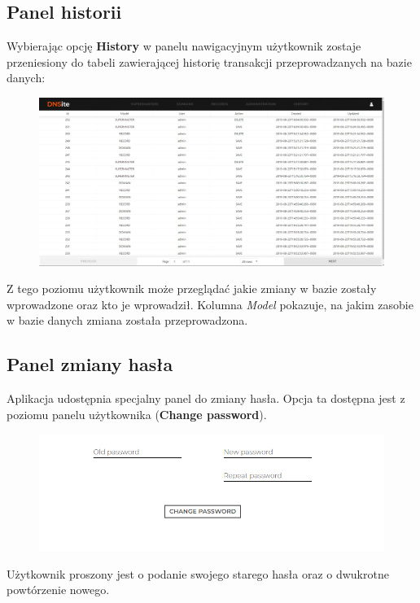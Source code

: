 \documentclass[12pt] {article}
\begin{document}
\subsection{Panel historii}
Wybierając opcję \textbf{History} w panelu nawigacyjnym użytkownik zostaje przeniesiony do tabeli zawierającej historię transakcji przeprowadzanych na bazie danych:
\begin{figure}[H]
\centering
\includegraphics[width=\textwidth]{res/x_historia}
\end{figure}
Z tego poziomu użytkownik może przeglądać jakie zmiany w bazie zostały wprowadzone oraz kto je wprowadził. Kolumna \emph{Model} pokazuje, na jakim zasobie w bazie danych zmiana została przeprowadzona. 


\subsection{Panel zmiany hasła}
Aplikacja udostępnia specjalny panel do zmiany hasła. Opcja ta dostępna jest z poziomu panelu użytkownika (\textbf{Change password}).
\begin{figure}[H]
\centering
\includegraphics[width=\textwidth]{res/x_zmiana_hasla}
\end{figure}
Użytkownik proszony jest o podanie swojego starego hasła oraz o dwukrotne powtórzenie nowego.
\end{document}
